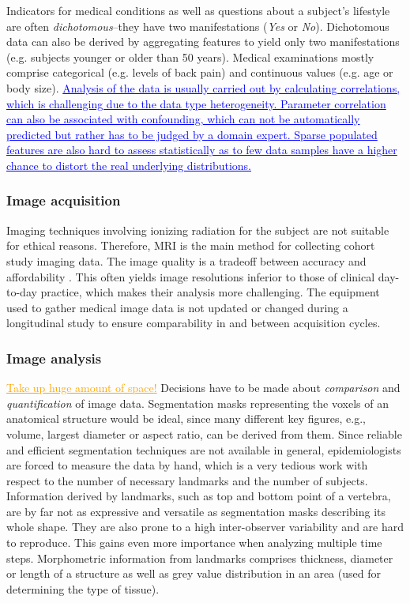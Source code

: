 \documentclass[journal]{style/vgtc} 			          %
\newcommand{\add}[1]{\textcolor{blue}{\uline{#1}}}
\newcommand{\com}[1]{\textcolor{orange}{\uline{#1}}}
\begin{document}
Indicators for medical conditions as well as questions about a subject's lifestyle are often \emph{dichotomous}--they have two manifestations (\emph{Yes} or \emph{No}).
%
Dichotomous data can also be derived by aggregating features to yield only two manifestations (e.g. subjects younger or older than 50 years).
%
Medical examinations mostly comprise categorical (e.g. levels of back pain) and continuous values (e.g. age or body size).
%
\add{Analysis of the data is usually carried out by calculating correlations,
which is challenging due to the data type heterogeneity.
%
Parameter correlation can also be associated with confounding, which can not be automatically predicted but rather has to be judged by a domain expert.
%
Sparse populated features are also hard to assess statistically as to few data samples have a higher chance to distort the real underlying distributions.
}

\subsubsection{Image acquisition} \label{ImageAcquisition} Imaging techniques involving ionizing radiation for the subject are not suitable for ethical reasons.
%
Therefore, MRI is the main method for collecting cohort study imaging data.
%
The image quality is a tradeoff between accuracy and affordability \cite{Preim2014}.
%
This often yields image resolutions inferior to those of clinical day-to-day practice, which makes their analysis more challenging.
%
The equipment used to gather medical image data is not updated or changed during a longitudinal study to ensure comparability in and between acquisition cycles.

\subsubsection{Image analysis} \label{ImageAnalysis}
\com{Take up huge amount of space!}
%
Decisions have to be made about \emph{comparison} and \emph{quantification} of image data.
%
Segmentation masks representing the voxels of an anatomical structure would be ideal, since many different key figures, e.g., volume, largest diameter or aspect ratio, can be derived from them.
%
Since reliable and efficient segmentation techniques are not available in general, epidemiologists are forced to measure the data by hand, which is a very tedious work with respect to the number of necessary landmarks and the number of subjects.
%
Information derived by landmarks, such as top and bottom point of a vertebra, are by far not as expressive and versatile as segmentation masks describing its whole shape.
%
They are also prone to a high inter-observer variability and are hard to reproduce.
%
This gains even more importance when analyzing multiple time steps.
%
Morphometric information from landmarks comprises thickness, diameter or length of a structure as well as grey value distribution in an area (used for determining the type of tissue).
\end{document}
